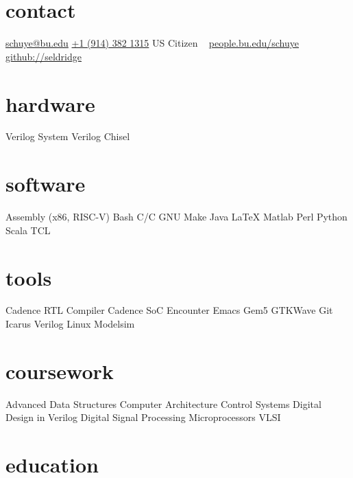 \documentclass[]{friggeri-cv} %
\begin{document}


\newcommand{\CPP}
{C\nolinebreak[4]\hspace{-.05em}\raisebox{.22ex}{\footnotesize\bf ++}}

\begin{aside} %
\section{contact}
\href{mailto:schuye@bu.edu}{schuye@bu.edu}
\href{tel:+19143821315}{+1 (914) 382 1315}
US Citizen
~
\href{http://people.bu.edu/schuye}{people.bu.edu/schuye}
\href{http://github.com/seldridge}{github://seldridge}
\section{hardware}
Verilog
System Verilog
Chisel
\section{software}
Assembly (x86, RISC-V)
Bash
C/\CPP
GNU Make
Java
\LaTeX
Matlab
Perl
Python
Scala
TCL
\section{tools}
Cadence RTL Compiler
Cadence SoC Encounter
Emacs
Gem5
GTKWave
Git
Icarus Verilog
Linux
Modelsim
\section{coursework}
Advanced Data Structures
Computer Architecture
Control Systems
Digital Design in Verilog
Digital Signal Processing
Microprocessors
VLSI
\end{aside}


\section{education}
\end{document}
